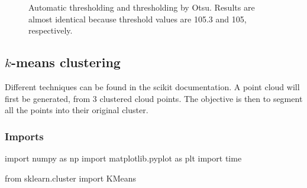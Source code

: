 \begin{figure}[htbp]
\centering\caption{Automatic thresholding and thresholding by Otsu. Results are almost identical because threshold values are 105.3 and 105, respectively.}%
\hfill
{}%
\label{fig:histoseg:python:otsu:cells}%
\end{figure}

\subsection{\texorpdfstring{$k$-means clustering}{k-means clustering}}
Different techniques can be found in the scikit documentation. A point cloud will first be generated, from 3 clustered cloud points. The objective is then to segment all the points into their original cluster.

\subsubsection{Imports}
\begin{python}
import numpy as np
import matplotlib.pyplot as plt
import time

from sklearn.cluster import KMeans
\end{python}


